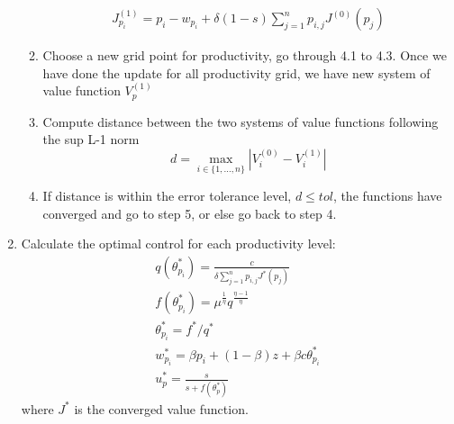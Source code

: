 \documentclass[10pt]{article} %
\begin{document}
\begin{enumerate}
\begin{enumerate}
\begin{gather*}
                    J^{(1)}_{p_i} = p_i - w_{p_i} + \delta (1-s)\sum_{j=1}^{n}p_{i,j}J^{(0)}(p_j)
                \end{gather*}
                \item Choose a new grid point for productivity, go through 4.1 to 4.3. Once we have done the update for all productivity grid, we have new system of value function \({V^{(1)}_p}\)
                \item Compute distance between the two systems of value functions following the sup L-1 norm \[
                    d = \max\limits_{i\in\{1,\ldots,n\}}|V^{(0)}_i-V^{(1)}_i|\]
                \item If distance is within the error tolerance level, \(d \leq tol\), the functions have converged and go to step 5, or else go back to step 4.
            \end{enumerate}
            \item Calculate the optimal control for each productivity level:
            \begin{gather*}
                q(\theta^*_{p_i}) = \frac{c}{\delta \sum_{j=1}^{n}p_{i,j}J^* (p_j)}\\
                f(\theta^*_{p_i}) = \mu^\frac{1}{\eta} q^\frac{\eta-1}{\eta}\\
                \theta^*_{p_i} = f^* / q^*\\
                w^*_{p_i} = \beta p_i + (1-\beta)z + \beta c \theta^*_{p_i}\\
                u^*_p = \frac{s}{s + f(\theta^*_p)}
            \end{gather*}
            where \(J^*\) is the converged value function.
    \end{enumerate}
\end{document}
